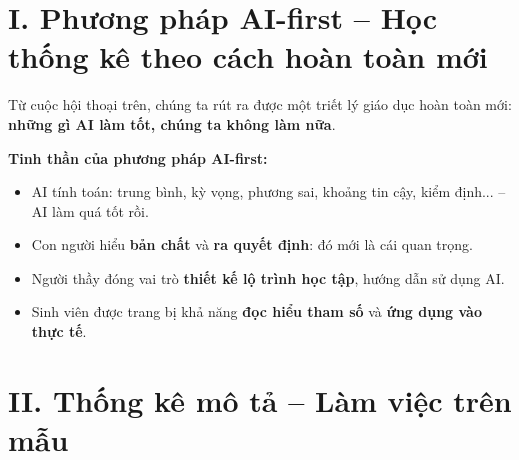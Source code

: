 \documentclass[a4paper,12pt]{article}
\theoremstyle{remark}
\begin{document}
\section*{\color{maincolor}I. Phương pháp AI-first – Học thống kê theo cách hoàn toàn mới}

Từ cuộc hội thoại trên, chúng ta rút ra được một triết lý giáo dục hoàn toàn mới: \textbf{những gì AI làm tốt, chúng ta không làm nữa}.

\begin{aibox}
\textbf{Tinh thần của phương pháp AI-first:}
\begin{itemize}
    \item AI tính toán: trung bình, kỳ vọng, phương sai, khoảng tin cậy, kiểm định... – AI làm quá tốt rồi.
    \item Con người hiểu \textbf{bản chất} và \textbf{ra quyết định}: đó mới là cái quan trọng.
    \item Người thầy đóng vai trò \textbf{thiết kế lộ trình học tập}, hướng dẫn sử dụng AI.
    \item Sinh viên được trang bị khả năng \textbf{đọc hiểu tham số} và \textbf{ứng dụng vào thực tế}.
\end{itemize}
\end{aibox}

\begin{center}
\end{center}

\section*{\color{maincolor}II. Thống kê mô tả – Làm việc trên mẫu}
\end{document}

